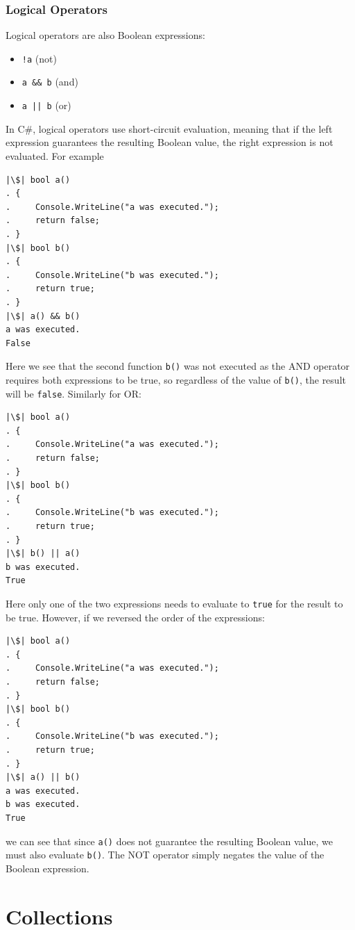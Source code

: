 \documentclass{article}
\begin{document}
\subsubsection{Logical Operators}
Logical operators are also Boolean expressions:
\begin{itemize}
    \item \texttt{!a} (not)
    \item \texttt{a && b} (and)
    \item \texttt{a || b} (or)
\end{itemize}
In C\#, logical operators use short-circuit evaluation, meaning that
if the left expression guarantees the resulting Boolean value,
the right expression is not evaluated. For example
\begin{verbatim}
|\$| bool a()
. {
.     Console.WriteLine("a was executed.");
.     return false;
. }
|\$| bool b()
. {
.     Console.WriteLine("b was executed.");
.     return true;
. }
|\$| a() && b()
a was executed.
False
\end{verbatim}
Here we see that the second function \texttt{b()} was not
executed as the {\ttfamily AND} operator requires both expressions to
be true, so regardless of the value of \texttt{b()}, the
result will be \texttt{false}. Similarly for {\ttfamily
OR}:
\begin{verbatim}
|\$| bool a()
. {
.     Console.WriteLine("a was executed.");
.     return false;
. }
|\$| bool b()
. {
.     Console.WriteLine("b was executed.");
.     return true;
. }
|\$| b() || a()
b was executed.
True
\end{verbatim}
Here only one of the two expressions needs to evaluate to
\texttt{true} for the result to be true. However, if we
reversed the order of the expressions:
\begin{verbatim}
|\$| bool a()
. {
.     Console.WriteLine("a was executed.");
.     return false;
. }
|\$| bool b()
. {
.     Console.WriteLine("b was executed.");
.     return true;
. }
|\$| a() || b()
a was executed.
b was executed.
True
\end{verbatim}
we can see that since \texttt{a()} does not guarantee the
resulting Boolean value, we must also evaluate
\texttt{b()}. The {\ttfamily NOT} operator simply negates
the value of the Boolean expression.
\section{Collections}
\end{document}
